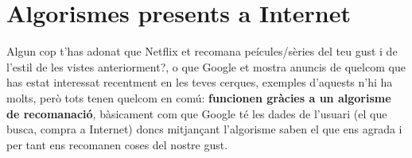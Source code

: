 \section{Algorismes presents a Internet}


Algun cop t'has adonat que Netflix et recomana pe\lgem ícules/sèries del teu gust i de l'estil de les vistes anteriorment?, o que Google et mostra anuncis de quelcom que has estat interessat recentment en les teves cerques, exemples d'aquests n'hi ha molts, però tots tenen quelcom en comú: \textbf{funcionen gràcies a un algorisme de recomanació}, bàsicament com que Google té les dades de l'usuari (el que busca, compra a Internet) doncs mitjançant l'algorisme saben el que ens agrada i per tant ens recomanen coses del nostre gust.